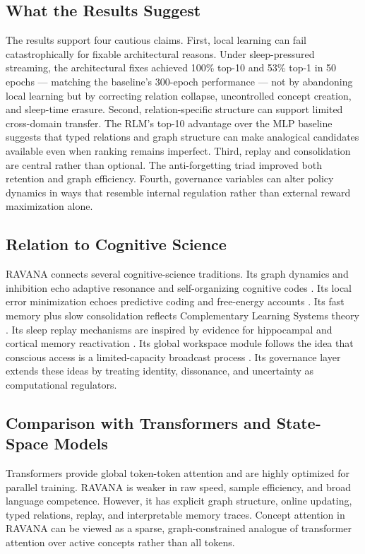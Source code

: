 \documentclass[11pt]{article}
\begin{document}
\subsection{What the Results Suggest}
The results support four cautious claims. First, local learning can fail catastrophically for fixable architectural reasons. Under sleep-pressured streaming, the architectural fixes achieved 100\% top-10 and 53\% top-1 in 50 epochs --- matching the baseline's 300-epoch performance --- not by abandoning local learning but by correcting relation collapse, uncontrolled concept creation, and sleep-time erasure. Second, relation-specific structure can support limited cross-domain transfer. The RLM's top-10 advantage over the MLP baseline suggests that typed relations and graph structure can make analogical candidates available even when ranking remains imperfect. Third, replay and consolidation are central rather than optional. The anti-forgetting triad improved both retention and graph efficiency. Fourth, governance variables can alter policy dynamics in ways that resemble internal regulation rather than external reward maximization alone.

\subsection{Relation to Cognitive Science}
RAVANA connects several cognitive-science traditions. Its graph dynamics and inhibition echo adaptive resonance and self-organizing cognitive codes \cite{grossberg1980}. Its local error minimization echoes predictive coding and free-energy accounts \cite{friston2010}. Its fast memory plus slow consolidation reflects Complementary Learning Systems theory \cite{mcclelland1995,kumaran2016}. Its sleep replay mechanisms are inspired by evidence for hippocampal and cortical memory reactivation \cite{wilson1994,ji2007,diekelmann2010}. Its global workspace module follows the idea that conscious access is a limited-capacity broadcast process \cite{baars1997}. Its governance layer extends these ideas by treating identity, dissonance, and uncertainty as computational regulators.

\subsection{Comparison with Transformers and State-Space Models}
Transformers provide global token-token attention and are highly optimized for parallel training. RAVANA is weaker in raw speed, sample efficiency, and broad language competence. However, it has explicit graph structure, online updating, typed relations, replay, and interpretable memory traces. Concept attention in RAVANA can be viewed as a sparse, graph-constrained analogue of transformer attention over active concepts rather than all tokens.
\end{document}
